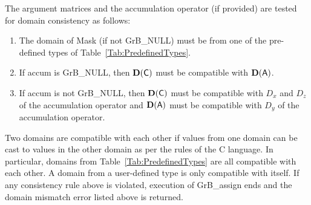 The argument matrices and the accumulation 
operator (if provided) are tested for domain consistency as follows:
\begin{enumerate}
	\item The domain of {\sf Mask} (if not {\sf GrB\_NULL}) must be from one of 
    the pre-defined types of Table~\ref{Tab:PredefinedTypes}.

	\item If {\sf accum} is {\sf GrB\_NULL}, then $\bold{D}({\sf C})$ must be 
    compatible with $\bold{D}({\sf A})$.

	\item If {\sf accum} is not {\sf GrB\_NULL}, then $\bold{D}({\sf C})$ must be
    compatible with $D_x$ and $D_z$ of the accumulation operator and 
    $\bold{D}({\sf A})$ must be compatible with $D_y$ of the accumulation operator.
\end{enumerate}
Two domains are compatible with each other if values from one domain can be cast 
to values in the other domain as per the rules of the C language.
In particular, domains from Table~\ref{Tab:PredefinedTypes} are all compatible 
with each other. A domain from a user-defined type is only compatible with itself.
If any consistency rule above is violated, execution of {\sf GrB\_assign} ends
and the domain mismatch error listed above is returned.

